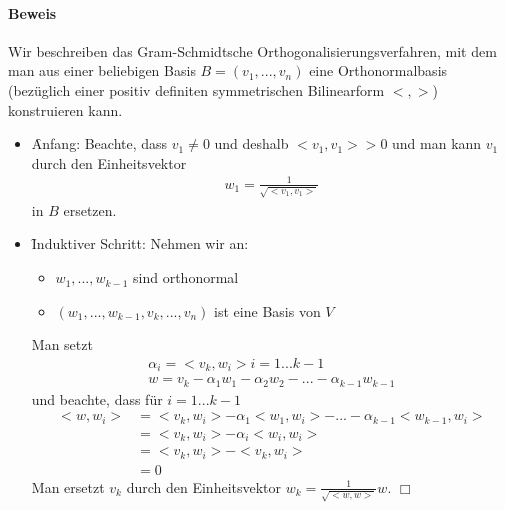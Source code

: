 \paragraph{Beweis}
Wir beschreiben das Gram-Schmidtsche Orthogonalisierungsverfahren, mit dem man aus einer beliebigen Basis $B = (v_1, ..., v_n)$ eine Orthonormalbasis (bezüglich einer positiv definiten symmetrischen Bilinearform $<, >$) konstruieren kann.

\begin{itemize}
\item \f{Anfang}: Beachte, dass $v_1 \neq 0$ und deshalb $<v_1, v_1> > 0$ und man kann $v_1$ durch den Einheitsvektor
\begin{align}
w_1 = \frac{1}{\sqrt{<v_1, v_1>}}
\end{align}
in $B$ ersetzen.

\item \f{Induktiver Schritt:} Nehmen wir an:
\begin{itemize}
\item $w_1, ..., w_{k-1}$ sind orthonormal
\item $(w_1, ..., w_{k-1}, v_k, ..., v_n)$ ist eine Basis von $V$
\end{itemize}
Man setzt
\begin{align}
\alpha_{i} = <v_k, w_i> i= 1...k-1 \\
w = v_k - \alpha_1 w_1 - \alpha_2 w_2 - ... - \alpha_{k-1} w_{k-1}
\end{align}
und beachte, dass für $i = 1...k-1$
\begin{align}
<w, w_i> &= <v_k, w_i> - \alpha_1 <w_1, w_i> - ... - \alpha_{k-1} <w_{k-1}, w_i> \\
&= <v_k, w_i> - \alpha_i <w_i, w_i> \\
&= <v_k, w_i> - <v_k, w_i> \\
&= 0
\end{align}
Man ersetzt $v_k$ durch den Einheitsvektor $w_k = \frac{1}{\sqrt{<w, w>}}w$. \hfill $\Box$
\end{itemize}

